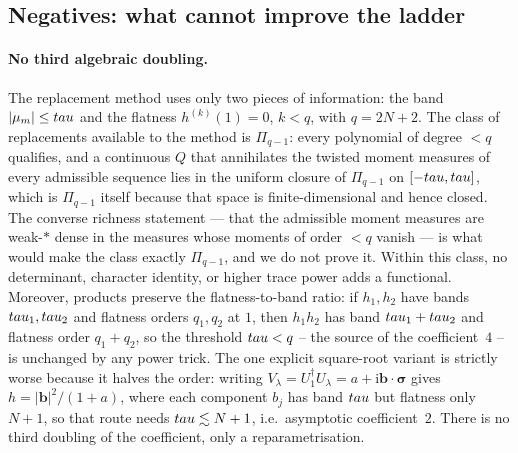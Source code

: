 \subsection{Negatives: what cannot improve the ladder}

\paragraph{No third algebraic doubling.} The replacement method uses only two pieces of
information: the band $|\mu_m|\le tau$ and the flatness $h^{(k)}(1)=0$, $k<q$, with
$q=2N+2$. The class of
replacements available to the method is $\Pi_{q-1}$: every polynomial of degree $<q$ qualifies,
and a continuous $Q$ that annihilates the twisted moment measures of every admissible sequence
lies in the uniform closure of $\Pi_{q-1}$ on $[-tau,tau]$, which is $\Pi_{q-1}$ itself
because that space is finite-dimensional and hence closed. The converse richness statement ---
that the admissible moment measures are weak-$*$ dense in the measures whose moments of order
$<q$ vanish --- is what would make the class exactly $\Pi_{q-1}$, and we do not prove it. Within
this class, no determinant, character identity, or higher trace power adds a functional. Moreover, products preserve the flatness-to-band ratio: if $h_1,h_2$ have
bands $tau_1,tau_2$ and flatness orders $q_1,q_2$ at $1$, then $h_1h_2$ has band
$tau_1+tau_2$ and flatness order $q_1+q_2$, so the threshold $tau<q$ -- the
source of the coefficient~$4$ -- is unchanged by any power trick. The one explicit
square-root variant is strictly worse because it halves the order: writing
$V_\lambda=U_1^\dagger U_\lambda=a+\mathrm{i}\mathbf{b}\cdot\bm{\sigma}$ gives
$h=|\mathbf{b}|^2/(1+a)$, where each component $b_j$ has band $tau$ but flatness only
$N+1$, so that route needs $tau\lesssim N+1$, i.e.\ asymptotic coefficient~$2$. There
is no third doubling of the coefficient, only a reparametrisation.

